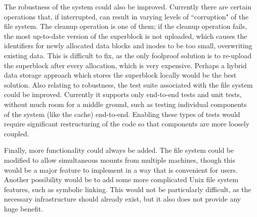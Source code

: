 \documentclass[11pt]{article}
\begin{document}
The robustness of the system could also be improved. Currently there are certain operations that, if interrupted, can result in varying levels of ``corruption" of the file system. The cleanup operation is one of them; if the cleanup operation fails, the most up-to-date version of the superblock is not uploaded, which causes the identifiers for newly allocated data blocks and inodes to be too small, overwriting existing data. This is difficult to fix, as the only foolproof solution is to re-upload the superblock after every allocation, which is very expensive. Perhaps a hybrid data storage approach which stores the superblock locally would be the best solution. Also relating to robustness, the test suite associated with the file system could be improved. Currently it supports only end-to-end tests and unit tests, without much room for a middle ground, such as testing individual components of the system (like the cache) end-to-end. Enabling these types of tests would require significant restructuring of the code so that components are more loosely coupled.

Finally, more functionality could always be added. The file system could  be modified to allow simultaneous mounts from multiple machines, though this would be a major feature to implement in a way that is convenient for users. Another possibility would be to add some more complicated Unix file system features, such as symbolic linking. This would not be particularly difficult, as the necessary infrastructure should already exist, but it also does not provide any huge benefit.
\end{document}
